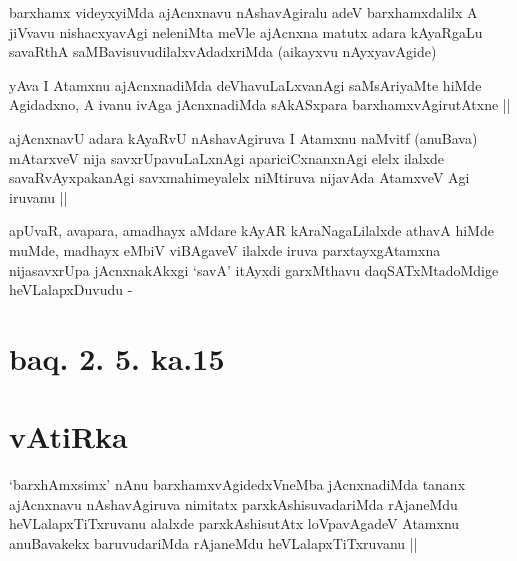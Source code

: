 
\begin{artha}
barxhamx videyxyiMda ajAcnxnavu nAshavAgiralu adeV barxhamxdalilx A
jiVvavu nishacxyavAgi neleniMta meVle ajAcnxna matutx adara kAyaRgaLu
savaRthA saMBavisuvudilalxvAdadxriMda (aikayxvu nAyxyavAgide)
\end{artha}


\begin{artha}
yAva I Atamxnu ajAcnxnadiMda deVhavuLaLxvanAgi saMsAriyaMte hiMde
Agidadxno, A ivanu ivAga jAcnxnadiMda sAkASxpara barxhamxvAgirutAtxne ||
\end{artha}


\begin{artha}
ajAcnxnavU adara kAyaRvU nAshavAgiruva I Atamxnu naMvitf (anuBava)
mAtarxveV nija savxrUpavuLaLxnAgi apariciCxnanxnAgi elelx ilalxde
savaRvAyxpakanAgi savxmahimeyalelx niMtiruva nijavAda AtamxveV Agi
iruvanu ||
\end{artha}


\begin{artha}
apUvaR, avapara, amadhayx aMdare kAyAR kAraNagaLilalxde athavA hiMde
muMde, madhayx eMbiV viBAgaveV ilalxde iruva parxtayxgAtamxna
nijasavxrUpa jAcnxnakAkxgi `savA' itAyxdi garxMthavu daqSATxMtadoMdige
heVLalapxDuvudu -
\end{artha}

\section*{baq. 2. 5. ka.15}

\section*{vAtiRka}


\begin{artha}
`barxhAmxsimx' nAnu barxhamxvAgidedxVneMba jAcnxnadiMda tananx
  ajAcnxnavu nAshavAgiruva nimitatx parxkAshisuvadariMda rAjaneMdu
  heVLalapxTiTxruvanu alalxde parxkAshisutAtx loVpavAgadeV Atamxnu
  anuBavakekx baruvudariMda rAjaneMdu heVLalapxTiTxruvanu ||
\end{artha}

